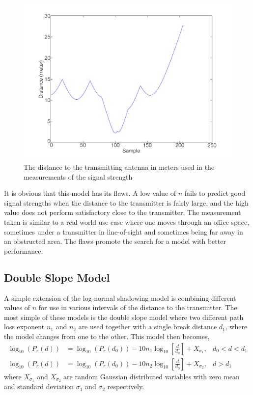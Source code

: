 \documentclass{LTHthesis}
\begin{document}
%
\begin{figure}[!hbt]

\includegraphics[width=1\textwidth ]{images/signal_model/dist_trans}
\caption{The distance to the transmitting antenna in meters used in the measurements of the signal strength}\label{dist_trans}
\end{figure}

It is obvious that this model has its flaws. A low value of $n$ fails to predict good signal strengths when the distance to the transmitter is fairly large, and the high value does not perform satisfactory close to the transmitter. The measurement taken is similar to a real world use-case where one moves through an office space, sometimes under a transmitter in line-of-sight and sometimes being far away in an obstructed area. The flaws promote the search for a model with better performance.
%
\subsection{Double Slope Model}
%
A simple extension of the log-normal shadowing model is combining different values of $n$ for use in various intervals of the distance to the transmitter. The most simple of these models is the double slope model where two different path loss exponent $n_1$ and $n_2$ are used together with a single break distance $d_1$, where the model changes from one to the other. This model then becomes,
\begin{subequations}
\begin{align}
\log_{10}({P_r(d)})&=\log_{10}({P_r(d_0)})-10n_1\log_{10}\left[{\frac{d}{d_0}}\right] + X_{\sigma_1}, & d_0<d<d_1\\
\log_{10}({P_r(d)})&=\log_{10}({P_r(d_0)})-10n_2\log_{10}\left[{\frac{d}{d_0}}\right] + X_{\sigma_2}, & d>d_1
\end{align}
\end{subequations} 
where $X_{\sigma_1}$ and $X_{\sigma_2}$ are random Gaussian distributed variables with zero mean and standard deviation $\sigma_1$ and $\sigma_2$ respectively.
 
\end{document}
